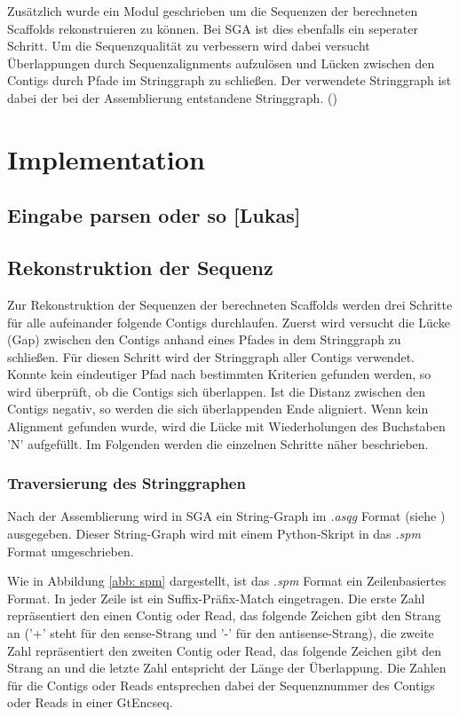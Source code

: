 \documentclass[a4paper,10pt,parskip]{scrartcl}
\begin{document}
Zusätzlich wurde ein Modul geschrieben um die Sequenzen der
berechneten Scaffolds rekonstruieren zu können. Bei SGA ist dies
ebenfalls ein seperater Schritt. Um die Sequenzqualität zu verbessern
wird dabei versucht Überlappungen durch Sequenzalignments aufzulösen
und Lücken zwischen den Contigs durch Pfade im Stringgraph zu
schließen. Der verwendete Stringgraph ist dabei der bei der
Assemblierung entstandene Stringgraph. ()

\section{Implementation}
\label{sec: Implementation}
\subsection{Eingabe parsen oder so [Lukas]}

\subsection{Rekonstruktion der Sequenz}
Zur Rekonstruktion der Sequenzen der berechneten Scaffolds werden drei
Schritte für alle aufeinander folgende Contigs durchlaufen. Zuerst
wird versucht die Lücke (Gap) zwischen den Contigs anhand eines Pfades
in dem Stringgraph zu schließen. Für diesen Schritt wird der
Stringgraph aller Contigs verwendet. Konnte kein eindeutiger Pfad nach
bestimmten Kriterien gefunden werden, so wird überprüft, ob die
Contigs sich überlappen. Ist die Distanz zwischen den Contigs negativ,
so werden die sich überlappenden Ende aligniert. Wenn kein Alignment
gefunden wurde, wird die Lücke mit Wiederholungen des Buchstaben 'N'
aufgefüllt.  Im Folgenden werden die einzelnen
Schritte näher beschrieben.

\subsubsection{Traversierung des Stringgraphen}
Nach der Assemblierung wird in SGA ein String-Graph im \textit{.asqg}
Format (siehe \cite{asqg}) ausgegeben. Dieser String-Graph wird mit
einem Python-Skript in das \textit{.spm} Format umgeschrieben.

Wie in Abbildung \ref{abb: spm} dargestellt, ist das \textit{.spm}
Format ein Zeilenbasiertes Format. In jeder Zeile ist ein
Suffix-Präfix-Match eingetragen. Die erste Zahl repräsentiert den
einen Contig oder Read, das folgende Zeichen gibt den Strang an ('+'
steht für den sense-Strang und '-' für den antisense-Strang), die
zweite Zahl repräsentiert den zweiten Contig oder Read, das folgende
Zeichen gibt den Strang an und die letzte Zahl entspricht der Länge
der Überlappung. Die Zahlen für die Contigs oder Reads entsprechen
dabei der Sequenznummer des Contigs oder Reads in einer GtEncseq.
\end{document}

